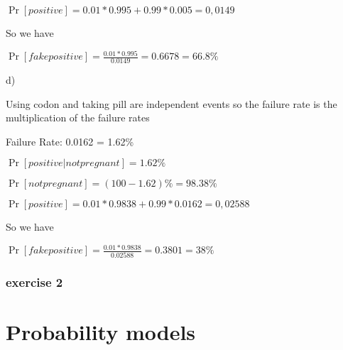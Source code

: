\documentclass{book} %
\begin{document}
$\Pr[positive]=0.01*0.995+0.99*0.005=0,0149$

So we have

$\Pr[fake positive] = \frac{0.01*0.995}{0.0149}=0.6678=66.8\%$

d)

Using codon and taking pill are independent events so the failure rate is the multiplication of the failure rates

Failure Rate: 0.0162 = 1.62\%

$\Pr[positive|not pregnant] = 1.62\%$

$\Pr[not pregnant]= (100-1.62)\%=98.38\%$

$\Pr[positive]=0.01*0.9838+0.99*0.0162=0,02588$

So we have

$\Pr[fake positive] = \frac{0.01*0.9838}{0.02588}=0.3801=38\%$

\subsubsection{exercise 2}


\section{Probability models}
\end{document}
